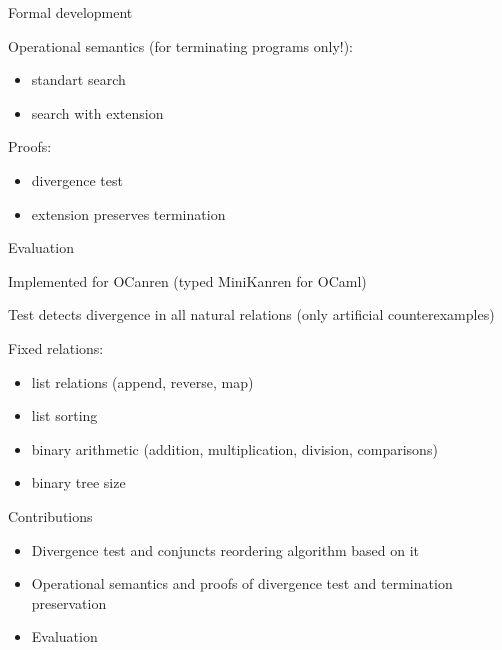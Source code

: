 \documentclass{beamer}
\theoremstyle{definition}
\theoremstyle{plain} %
\begin{document}
\begin{frame}{Formal development}

Operational semantics (for terminating programs only!):
 \begin{itemize}
 \item standart search
 \item search with extension
 \end{itemize}
 
 \vskip1cm
 
 Proofs:
 \begin{itemize}
 \item divergence test
 \item extension preserves termination
 \end{itemize}
 
\end{frame}

\begin{frame}{Evaluation}

Implemented for OCanren (typed MiniKanren for OCaml)

 \vskip8mm

Test detects divergence in all natural relations (only artificial counterexamples)

 \vskip8mm

Fixed relations:
 \begin{itemize}
 \item list relations (append, reverse, map)
 \item list sorting
 \item binary arithmetic (addition, multiplication, division, comparisons)
 \item binary tree size
 \end{itemize}
 
\end{frame}

\begin{frame}{Contributions}

\begin{itemize}
 \item Divergence test and conjuncts reordering algorithm based on it
 \vskip1cm
 \item Operational semantics and proofs of divergence test and termination preservation
 \vskip1cm
 \item Evaluation
\end{itemize}
 
\end{frame}
\end{document}
